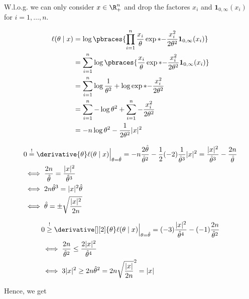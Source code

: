\begin{solution}
\begin{enumerate}[label = (\alph*)]
    W.l.o.g. we can only consider $x \in \R_+^n$ and drop the factores $x_i$ and $\mathbf 1_{0, \infty}(x_i)$ for $i = 1, \dots, n$.

    \begin{align*}
        \ell(\theta \mid x)
        & =
        \log
        \pbraces
        {
            \prod_{i=1}^n
            \frac{x_i}{\theta} \exp*{-\frac{x_i^2}{2 \theta^2}} \mathbf 1_{0, \infty}(x_i)
        } \\
        & =
        \sum_{i=1}^n
            \log
            \pbraces
            {
                \frac{x_i}{\theta} \exp*{-\frac{x_i^2}{2 \theta^2}} \mathbf 1_{0, \infty}(x_i)
            } \\
        & =
        \sum_{i=1}^n
            \log \frac{1}{\theta^2}
            +
            \log \exp*{-\frac{x_i^2}{2 \theta^2}} \\
        & =
        \sum_{i=1}^n -\log \theta^2
        +
        \sum_{i=1}^n -\frac{x_i^2}{2 \theta^2} \\
        & =
        -n \log \theta^2 - \frac{1}{2 \theta^2} |x|^2
    \end{align*}

    \begin{align*}
        &
        0 \stackrel{!}{=} \derivative{\theta} \ell(\theta \mid x) \Big |_{\theta = \hat \theta} = -n \frac{2 \hat \theta}{\hat \theta^2} - \frac{1}{2} (-2) \frac{1}{\hat \theta^3} |x|^2 = \frac{|x|^2}{\hat \theta^3} - \frac{2 n }{\hat \theta} \\
        & \iff
        \frac{2 n}{\hat \theta} = \frac{|x|^2}{\hat \theta^3} \\
        & \iff
        2 n \hat \theta^3 = |x|^2 \hat \theta \\
        & \iff
        \hat \theta = \pm \sqrt \frac{|x|^2}{2 n}
    \end{align*}

    \begin{align*}
        &
        0 \stackrel{!}{\geq} \derivative[][2]{\theta} \ell(\theta \mid x) \Big |_{\theta = \hat \theta} = (-3) \frac{|x|^2}{\hat \theta^4} - (-1) \frac{2 n}{\hat \theta^2} \\
        & \iff
        \frac{2 n}{\hat \theta^2} \leq \frac{2 |x|^2}{\hat \theta^4} \\
        & \iff
        3 |x|^2 \geq 2 n \hat \theta^2 = 2 n \sqrt \frac{|x|}{2 n}^2 = |x|
    \end{align*}

    Hence, we get


\end{enumerate}
\end{solution}
